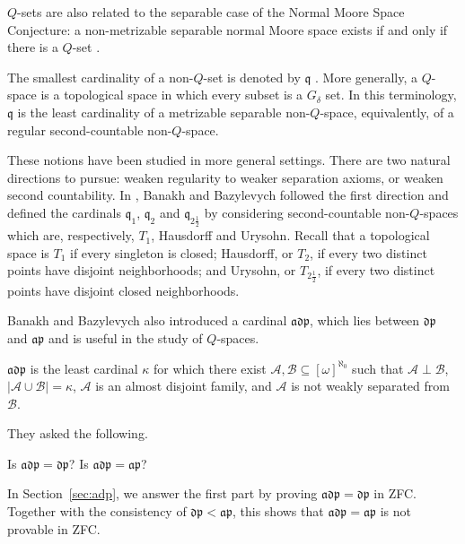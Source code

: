 $Q$-sets are also related to the separable case of the Normal Moore Space
Conjecture: a non-metrizable separable normal Moore space exists if and only if
there is a $Q$-set \cite{heath1964screenability}.

The smallest cardinality of a non-$Q$-set is denoted by $\mathfrak q$
\cite{miller1984special,brendle1999dow}.
More generally, a $Q$-space is a topological space in which every subset is a
$G_\delta$ set. In this terminology, $\mathfrak q$ is the least cardinality of
a metrizable separable non-$Q$-space, equivalently, of a regular second-countable
non-$Q$-space.

These notions have been studied in more general settings. There are two natural
directions to pursue: weaken regularity to weaker separation axioms, or weaken
second countability. In \cite{banakh2023q}, Banakh and Bazylevych followed the
first direction and defined the cardinals $\mathfrak q_1$, $\mathfrak q_2$ and
$\mathfrak q_{2\frac{1}{2}}$ by considering second-countable non-$Q$-spaces
which are, respectively, $T_1$, Hausdorff and Urysohn. Recall that a topological
space is $T_1$ if every singleton is closed; Hausdorff, or $T_2$, if every two
distinct points have disjoint neighborhoods; and Urysohn, or
$T_{2\frac{1}{2}}$, if every two distinct points have disjoint closed
neighborhoods.

Banakh and Bazylevych also introduced a cardinal $\mathfrak{adp}$, which lies
between $\mathfrak{dp}$ and $\mathfrak{ap}$ and is useful in the study of
$Q$-spaces.

\begin{definition}
    $\mathfrak{adp}$ is the least cardinal $\kappa$ for which there exist $\mathcal A,\mathcal B\subseteq[\omega]^{\aleph_0}$ such that $\mathcal A\perp\mathcal B$, $|\mathcal A\cup\mathcal B|=\kappa$, $\mathcal A$ is an almost disjoint family, and $\mathcal A$ is not weakly separated from $\mathcal B$.
\end{definition}

They asked the following.

\begin{prob} Is $\mathfrak{adp}=\mathfrak{dp}$? Is $\mathfrak{adp}=\mathfrak{ap}$?
\end{prob}

In Section~\ref{sec:adp}, we answer the first part by proving
$\mathfrak{adp}=\mathfrak{dp}$ in ZFC. Together with the consistency of
$\mathfrak{dp}<\mathfrak{ap}$, this shows that
$\mathfrak{adp}=\mathfrak{ap}$ is not provable in ZFC.

